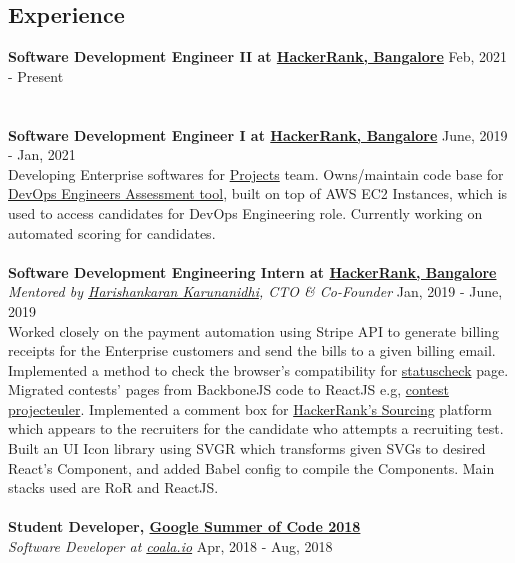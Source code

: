 \documentclass[margin, centered]{res}
\begin{document}
\begin{resume}
    \section{Experience}
    \textbf{Software Development Engineer II at \href{https://www.hackerrank.com}{HackerRank, Bangalore}} \hfill Feb, 2021 - Present \\
    \\
    \\
    \textbf{Software Development Engineer I at \href{https://www.hackerrank.com}{HackerRank, Bangalore}} \hfill June, 2019 - Jan, 2021 \\
    Developing Enterprise softwares for \href{https://www.hackerrank.com/products/projects}{Projects} team. Owns/maintain code base for \href{https://www.hackerrank.com/products/projects#role5}{DevOps Engineers Assessment tool},
    built on top of AWS EC2 Instances, which is used to access candidates for DevOps Engineering role. Currently working on automated scoring for candidates.\\
    \\
    \textbf{Software Development Engineering Intern at \href{https://www.hackerrank.com}{HackerRank, Bangalore}} \\
    \emph{Mentored by \href{https://www.hackerrank.com/about-us/our-team/}{Harishankaran Karunanidhi}\footnotesize{, CTO \& Co-Founder}} \hfill Jan, 2019 - June, 2019 \\
    Worked closely on the payment automation using Stripe API to generate billing receipts for
    the Enterprise customers and send the bills to a given billing email. Implemented a method to check the browser's compatibility
    for \href{https://www.hackerrank.com/statuscheck}{statuscheck} page. Migrated contests' pages from
    BackboneJS code to ReactJS e.g, \href{https://www.hackerrank.com/projecteuler/}{contest projecteuler}.
    Implemented a comment box for \href{https://www.hackerrank.com/work}{HackerRank's Sourcing} platform
    which appears to the recruiters for the candidate who attempts a recruiting test. Built an UI Icon library
    using SVGR which transforms given SVGs to desired React's Component, and added Babel config to compile
    the Components. Main stacks used are RoR and ReactJS. \\
    \\
    \textbf{Student Developer, \href{https://summerofcode.withgoogle.com/}{Google Summer of Code 2018}} \\
    \emph{Software Developer at \href{https://coala.io/}{coala.io}} \hfill Apr, 2018 - Aug, 2018 \\

\end{resume}
\end{document}

